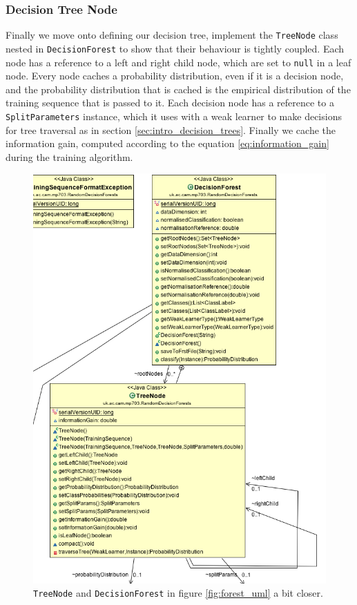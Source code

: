 \documentclass[12pt,twoside,notitlepage]{report}
\begin{document}
            \subsubsection{Decision Tree Node}
                Finally we move onto defining our decision tree, implement the \texttt{TreeNode} class nested in 
                \texttt{DecisionForest} to show that their behaviour is tightly coupled. Each node has a reference 
                to a left and right child node, which are set to \texttt{null} in a leaf node. Every node caches a 
                probability distribution, even if it is a decision node, and the 
                probability distribution that is cached is the empirical distribution of the training sequence that is 
                passed to it. Each decision node has a reference to a \texttt{SplitParameters} instance, which it 
                uses with a weak learner to make decisions for tree traversal as in section 
                \ref{sec:intro_decision_trees}. Finally we cache the information gain, computed according to the 
                equation \ref{eq:information_gain} during the training algorithm.

                \begin{figure}[H]
                    \centering
                    \includegraphics[scale=0.5]{Tree_Forest_UML}
                    \caption{\texttt{TreeNode} and \texttt{DecisionForest} in figure \ref{fig:forest_uml} a bit closer.}
                    \label{fig:weak_learner_uml}
                \end{figure}
\end{document}
